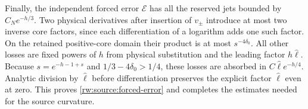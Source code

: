 Finally, the independent forced error $\mathcal E$ has all the
reserved jets bounded by $C_Ne^{-h/3}$. Two physical derivatives
after insertion of $v_\pm$ introduce at most two inverse core
factors, since each differentiation of a logarithm adds one such
factor. On the retained positive-core domain their product is at
most $s^{-4\delta_0}$. All other losses are fixed powers of $h$
from physical substitution and the leading factor $h\widehat\ell$.
Because $s=e^{-h-1+s}$ and $1/3-4\delta_0>1/4$, these losses
are absorbed in $C\widehat\ell e^{-h/4}$. Analytic division by
$\widehat\ell$ before differentiation preserves the explicit factor
$\widehat\ell$ even at zero. This proves \eqref{rw:source:forced-error}
and completes the estimates needed for the source curvature.
